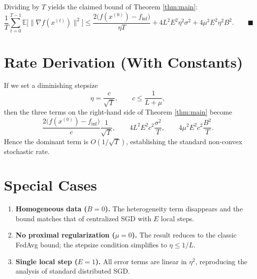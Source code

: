 \documentclass[11pt]{article}
\newcommand{\E}{\mathbb{E}}
\begin{document}
Dividing by $T$ yields the claimed bound of Theorem \ref{thm:main}:
\[
\frac{1}{T}\sum_{t=0}^{T-1}\E\bigl[\|\nabla f(x^{(t)})\|^{2}\bigr]
\le \frac{2\bigl(f(x^{(0)})-f_{\inf}\bigr)}{\eta T}
+4L^{2}E^{2}\eta^{2}\sigma^{2}
+4\mu^{2}E^{2}\eta^{2}B^{2}.
\qquad\blacksquare
\]

\section*{Rate Derivation (With Constants)}
If we set a diminishing stepsize
\[
\eta = \frac{c}{\sqrt{T}},\qquad c\le\frac{1}{L+\mu},
\]
then the three terms on the right‑hand side of Theorem \ref{thm:main} become
\[
\frac{2\bigl(f(x^{(0)})-f_{\inf}\bigr)}{c}\frac{1}{\sqrt{T}},\qquad
4L^{2}E^{2}c^{2}\frac{\sigma^{2}}{T},\qquad
4\mu^{2}E^{2}c^{2}\frac{B^{2}}{T}.
\]
Hence the dominant term is $O(1/\sqrt{T})$, establishing the standard non‑convex stochastic rate.

\section*{Special Cases}
\begin{enumerate}[noitemsep]
\item \textbf{Homogeneous data ($B=0$).} The heterogeneity term disappears and the bound matches that of centralized SGD with $E$ local steps.
\item \textbf{No proximal regularization ($\mu=0$).} The result reduces to the classic FedAvg bound; the stepsize condition simplifies to $\eta\le 1/L$.
\item \textbf{Single local step ($E=1$).} All error terms are linear in $\eta^{2}$, reproducing the analysis of standard distributed SGD.
\end{enumerate}
\end{document}
